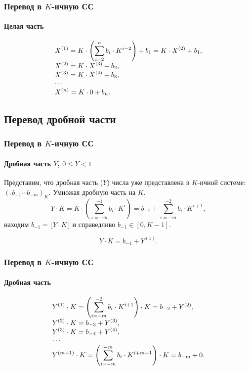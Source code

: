 \begin{frame}
    \frametitle{Перевод в $K$-ичную СС}
    \framesubtitle{Целая часть}

    \[
        \begin{array}[c]{l}
            \displaystyle
            X^{(1)}=K\cdot\left(\sum_{i=2}^{n}b_i\cdot K^{i-2}\right)+b_{1} = K\cdot X^{(2)}+b_{1},\\
            \displaystyle
            X^{(2)}=K\cdot X^{(3)}+b_{2},\\
            \displaystyle
            X^{(3)}=K\cdot X^{(4)}+b_{3},\\
            \displaystyle
            \cdots \\
            \displaystyle
            X^{(n)}=K\cdot 0 + b_{n}.
        \end{array}
    \]
\end{frame}


\subsection{Перевод дробной части}

\begin{frame}
    \frametitle{Перевод в $K$-ичную СС}
    \framesubtitle{Дробная часть $Y$, $0\leq Y < 1$}
    
    Представим, что дробная часть ($Y$) числа уже представлена в $K$-ичной системе: $(.b_{-1}\cdots b_{-m})_K$. Умножая дробную часть на $K$.
    \[
        Y\cdot K = 
            K\cdot \left(\sum_{i=-m}^{-1}b_i\cdot K^{i} \right)=
                b_{-1} + \sum_{i=-m}^{-2}b_i\cdot K^{i+1},
    \]
    находим $b_{-1}=\lfloor Y\cdot K\rfloor$ и справедливо $b_{-1}\in[0,K-1]$.
    
    \[Y\cdot K = b_{-1} + Y^{(1)}.\]
\end{frame}

\begin{frame}
    \frametitle{Перевод в $K$-ичную СС}
    \framesubtitle{Дробная часть}
    
    \[
        \begin{array}[c]{l}
            \displaystyle
            Y^{(1)}\cdot K = \left(\sum_{i=-m}^{-2}b_i\cdot K^{i+1} \right)\cdot K=
                b_{-2} + Y^{(2)},\\
            \displaystyle
            Y^{(2)}\cdot K = b_{-3} + Y^{(3)},\\
            \displaystyle
            Y^{(3)}\cdot K = b_{-4} + Y^{(4)},\\
            \cdots \\
            \displaystyle
            Y^{(m-1)}\cdot K = \left(\sum_{i=-m}^{-m}b_i\cdot K^{i+m-1} \right)\cdot K=
                b_{-m} + 0.
        \end{array}
    \]
\end{frame}

